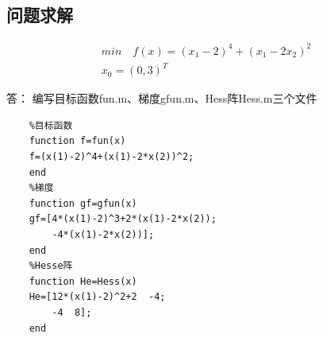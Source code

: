 \documentclass[12pt]{article} %
\begin{document}
	\subsection{问题求解}
	\begin{gather*}
	min\quad f(x)=(x_1-2)^4+(x_1-2x_2)^2\\
	x_0=(0,3)^T
	\end{gather*}
	
	答：
	编写目标函数fun.m、梯度gfun.m、Hess阵Hess.m三个文件
	\begin{lstlisting}
	%目标函数
	function f=fun(x)
	f=(x(1)-2)^4+(x(1)-2*x(2))^2;
	end
	%梯度
	function gf=gfun(x)
	gf=[4*(x(1)-2)^3+2*(x(1)-2*x(2));
		-4*(x(1)-2*x(2))];
	end
	%Hesse阵
	function He=Hess(x)
	He=[12*(x(1)-2)^2+2  -4;
		-4  8];
	end
	\end{lstlisting}
	
\end{document}
